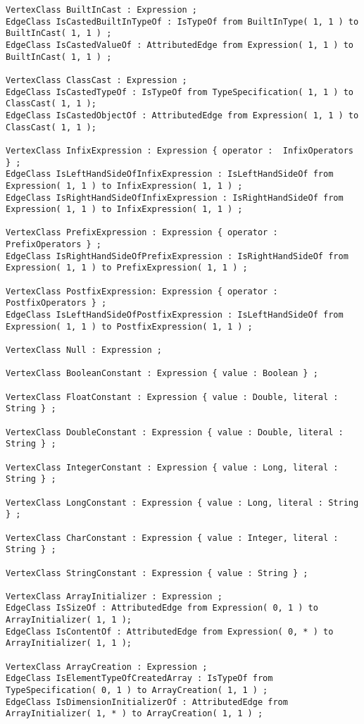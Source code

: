 \begin{lstlisting}[caption=Das im Javaextraktor eingesetzte Schema, label=schema_complete, captionpos=b, style=tgschema]
VertexClass BuiltInCast : Expression ;
EdgeClass IsCastedBuiltInTypeOf : IsTypeOf from BuiltInType( 1, 1 ) to BuiltInCast( 1, 1 ) ; 
EdgeClass IsCastedValueOf : AttributedEdge from Expression( 1, 1 ) to BuiltInCast( 1, 1 ) ;

VertexClass ClassCast : Expression ;
EdgeClass IsCastedTypeOf : IsTypeOf from TypeSpecification( 1, 1 ) to ClassCast( 1, 1 );
EdgeClass IsCastedObjectOf : AttributedEdge from Expression( 1, 1 ) to ClassCast( 1, 1 );

VertexClass InfixExpression : Expression { operator :  InfixOperators } ;
EdgeClass IsLeftHandSideOfInfixExpression : IsLeftHandSideOf from Expression( 1, 1 ) to InfixExpression( 1, 1 ) ;
EdgeClass IsRightHandSideOfInfixExpression : IsRightHandSideOf from Expression( 1, 1 ) to InfixExpression( 1, 1 ) ;

VertexClass PrefixExpression : Expression { operator :  PrefixOperators } ;
EdgeClass IsRightHandSideOfPrefixExpression : IsRightHandSideOf from Expression( 1, 1 ) to PrefixExpression( 1, 1 ) ; 

VertexClass PostfixExpression: Expression { operator :  PostfixOperators } ;
EdgeClass IsLeftHandSideOfPostfixExpression : IsLeftHandSideOf from Expression( 1, 1 ) to PostfixExpression( 1, 1 ) ;

VertexClass Null : Expression ;

VertexClass BooleanConstant : Expression { value : Boolean } ;

VertexClass FloatConstant : Expression { value : Double, literal : String } ;

VertexClass DoubleConstant : Expression { value : Double, literal : String } ;

VertexClass IntegerConstant : Expression { value : Long, literal : String } ;

VertexClass LongConstant : Expression { value : Long, literal : String } ;

VertexClass CharConstant : Expression { value : Integer, literal : String } ;

VertexClass StringConstant : Expression { value : String } ;

VertexClass ArrayInitializer : Expression ;
EdgeClass IsSizeOf : AttributedEdge from Expression( 0, 1 ) to ArrayInitializer( 1, 1 );
EdgeClass IsContentOf : AttributedEdge from Expression( 0, * ) to ArrayInitializer( 1, 1 );

VertexClass ArrayCreation : Expression ;
EdgeClass IsElementTypeOfCreatedArray : IsTypeOf from TypeSpecification( 0, 1 ) to ArrayCreation( 1, 1 ) ;
EdgeClass IsDimensionInitializerOf : AttributedEdge from ArrayInitializer( 1, * ) to ArrayCreation( 1, 1 ) ;


\end{lstlisting}
